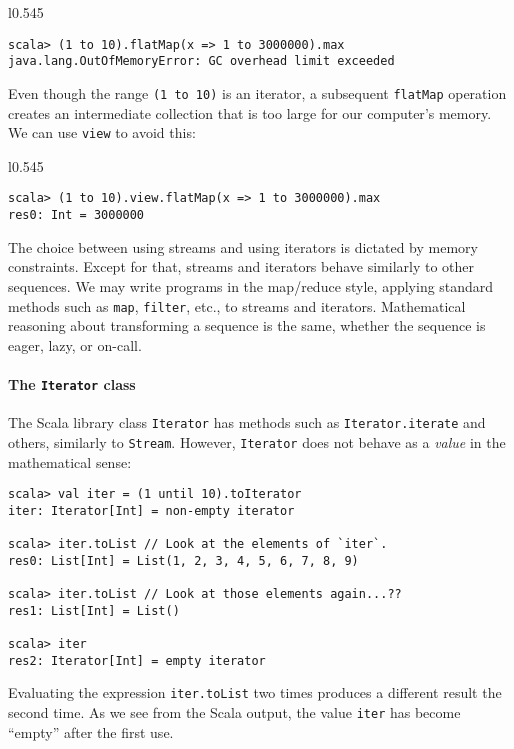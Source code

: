 \begin{wrapfigure}{l}{0.545\columnwidth}%
\vspace{-0.75\baselineskip}
\begin{lstlisting}
scala> (1 to 10).flatMap(x => 1 to 3000000).max
java.lang.OutOfMemoryError: GC overhead limit exceeded
\end{lstlisting}
\vspace{-0.75\baselineskip}
\end{wrapfigure}%

\noindent Even though the range \lstinline!(1 to 10)! is an iterator,
a subsequent \lstinline!flatMap! operation creates an intermediate
collection that is too large for our computer\textsf{'}s memory. We can use
\lstinline!view! to avoid this:

\begin{wrapfigure}{l}{0.545\columnwidth}%
\vspace{-0.75\baselineskip}
\begin{lstlisting}
scala> (1 to 10).view.flatMap(x => 1 to 3000000).max
res0: Int = 3000000
\end{lstlisting}
\vspace{-0.75\baselineskip}
\end{wrapfigure}%

\noindent The choice between using streams and using iterators is
dictated by memory constraints. Except for that, streams and iterators
behave similarly to other sequences. We may write programs in the
map/reduce style, applying standard methods such as \lstinline!map!,
\lstinline!filter!, etc., to streams and iterators. Mathematical
reasoning about transforming a sequence is the same, whether the sequence
is eager, lazy, or on-call.

\paragraph{The \texttt{Iterator} class}

The Scala library class \lstinline!Iterator! has methods such as
\lstinline!Iterator.iterate! and others, similarly to \lstinline!Stream!.
However, \lstinline!Iterator! does not behave as a \emph{value} in
the mathematical sense:
\begin{lstlisting}
scala> val iter = (1 until 10).toIterator
iter: Iterator[Int] = non-empty iterator

scala> iter.toList // Look at the elements of `iter`.
res0: List[Int] = List(1, 2, 3, 4, 5, 6, 7, 8, 9)

scala> iter.toList // Look at those elements again...??
res1: List[Int] = List()

scala> iter
res2: Iterator[Int] = empty iterator
\end{lstlisting}
Evaluating the expression \lstinline!iter.toList! two times produces
a different result the second time. As we see from the Scala output,
the value \lstinline!iter! has become \textsf{``}empty\textsf{''} after the first
use.


